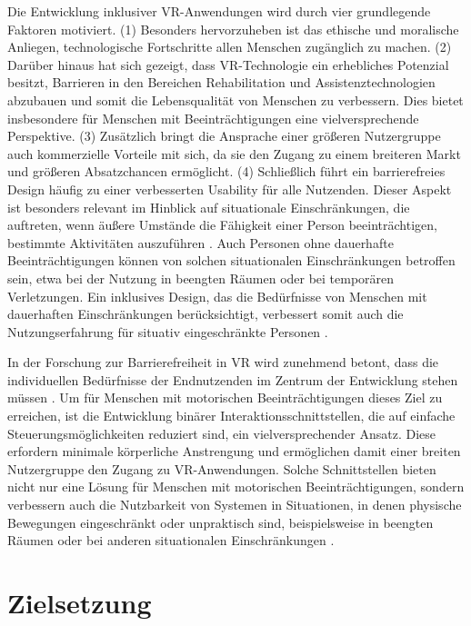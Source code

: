 Die Entwicklung inklusiver VR-Anwendungen wird durch vier grundlegende Faktoren motiviert. (1) Besonders hervorzuheben ist das ethische und moralische Anliegen, technologische Fortschritte allen Menschen zugänglich zu machen. (2) Darüber hinaus hat sich gezeigt, dass VR-Technologie ein erhebliches Potenzial besitzt, Barrieren in den Bereichen Rehabilitation und Assistenztechnologien abzubauen und somit die Lebensqualität von Menschen zu verbessern. Dies bietet insbesondere für Menschen mit Beeinträchtigungen eine vielversprechende Perspektive. (3) Zusätzlich bringt die Ansprache einer größeren Nutzergruppe auch kommerzielle Vorteile mit sich, da sie den Zugang zu einem breiteren Markt und größeren Absatzchancen ermöglicht. (4) Schließlich führt ein barrierefreies Design häufig zu einer verbesserten Usability für alle Nutzenden. Dieser Aspekt ist besonders relevant im Hinblick auf situationale Einschränkungen, die auftreten, wenn äußere Umstände die Fähigkeit einer Person beeinträchtigen, bestimmte Aktivitäten auszuführen \citep{10.1145/1952383.1952384}. Auch Personen ohne dauerhafte Beeinträchtigungen können von solchen situationalen Einschränkungen betroffen sein, etwa bei der Nutzung in beengten Räumen oder bei temporären Verletzungen. Ein inklusives Design, das die Bedürfnisse von Menschen mit dauerhaften Einschränkungen berücksichtigt, verbessert somit auch die Nutzungserfahrung für situativ eingeschränkte Personen \citep{dudley_inclusive_2023}.

In der Forschung zur Barrierefreiheit in VR wird zunehmend betont, dass die individuellen Bedürfnisse der Endnutzenden im Zentrum der Entwicklung stehen müssen \citep{10.1007/978-3-030-21607-8_3}. Um für Menschen mit motorischen Beeinträchtigungen dieses Ziel zu erreichen, ist die Entwicklung binärer Interaktionsschnittstellen, die auf einfache Steuerungsmöglichkeiten reduziert sind, ein vielversprechender Ansatz.
Diese erfordern minimale körperliche Anstrengung und ermöglichen damit einer breiten Nutzergruppe den Zugang zu VR-Anwendungen. Solche Schnittstellen bieten nicht nur eine Lösung für Menschen mit motorischen Beeinträchtigungen, sondern verbessern auch die Nutzbarkeit von Systemen in Situationen, in denen physische Bewegungen eingeschränkt oder unpraktisch sind, beispielsweise in beengten Räumen oder bei anderen situationalen Einschränkungen \citep{10.1145/1952383.1952384}.

\section{Zielsetzung}

